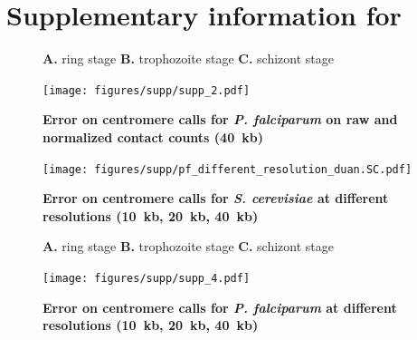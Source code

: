 \chapter[Supplementaries for \citet{varoquaux:accurate}]{Supplementary information for
\citet{varoquaux:accurate}}

\graphicspath{{9_centurion_supplementaries/}}


\begin{figure}[ht!]
\caption{\textbf{Error on centromere calls for \textit{P. falciparum} on raw
and normalized contact counts (40~kb)}}{
\textbf{A.} ring stage \textbf{B.}
trophozoite stage \textbf{C.} schizont stage}
\begin{center}
\texttt{[image: figures/supp/supp\_2.pdf]}
\end{center}
\label{suppfig:raw_vs_normed_pf}
\end{figure}

\clearpage

\begin{figure}[ht!]
\caption{\textbf{Error on centromere calls for \textit{S. cerevisiae}
at different resolutions (10~kb, 20~kb, 40~kb)}}
\begin{center}
\texttt{[image: figures/supp/pf\_different\_resolution\_duan.SC.pdf]}
\end{center}
\label{suppfig:error_diff_res_sc}
\end{figure}


\begin{figure}[ht!]
\caption{\textbf{Error on centromere calls for \textit{P. falciparum}
at different resolutions (10~kb, 20~kb, 40~kb)}}
{\textbf{A.} ring stage \textbf{B.} trophozoite stage \textbf{C.} schizont stage}
\begin{center}
\texttt{[image: figures/supp/supp\_4.pdf]}
\end{center}
\label{suppfig:error_diff_res_pf}
\end{figure}

\clearpage

